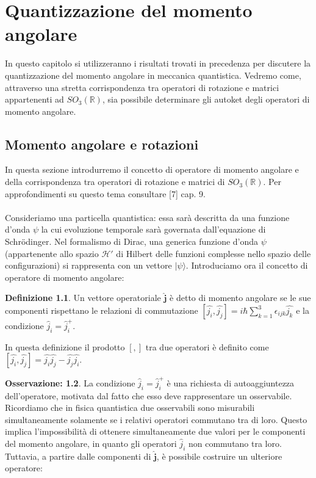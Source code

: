 \documentclass[12pt,a4paper]{report}
\theoremstyle{definition}
\newtheorem{Def}{Definizione}[chapter]
\theoremstyle{Theorem}
\theoremstyle{definition}
\theoremstyle{definition}
\theoremstyle{definition}
\newtheorem{Obs}[Def]{Osservazione:}
\begin{document}
\chapter{Quantizzazione del momento angolare}
In questo capitolo si utilizzeranno i risultati trovati in precedenza per discutere la quantizzazione del momento angolare in meccanica quantistica. Vedremo come, attraverso una stretta corrispondenza tra operatori di rotazione e matrici appartenenti ad $SO_3(\mathbb{R})$, sia possibile determinare gli autoket degli operatori di momento angolare.
\section{Momento angolare e rotazioni}
In questa sezione introdurremo il concetto di operatore di momento angolare e della corrispondenza tra operatori di rotazione e matrici di $SO_3(\mathbb{R})$. Per approfondimenti su questo tema consultare [7] cap. 9. \\\\
Consideriamo una particella quantistica: essa sarà descritta da una funzione d'onda $\psi$ la cui evoluzione temporale sarà governata dall'equazione di Schrödinger. Nel formalismo di Dirac, una generica funzione d'onda $\psi$ (appartenente allo spazio $\mathcal{H'}$ di Hilbert delle funzioni complesse nello spazio delle configurazioni) si rappresenta con un vettore $|\psi\rangle$. Introduciamo ora il concetto di operatore di momento angolare:
\begin{Def}
	Un vettore operatoriale $\hat{\textbf{j}}$ è detto di momento angolare se le sue componenti rispettano le relazioni di commutazione $[\hat{j_i},\hat{j_j}]=i\hbar\sum_{k=1}^{3}\epsilon_{ijk}\hat{j_k}$ e la condizione $\hat{j}_i=\hat{j}^+_i$.
\end{Def} 
In questa definizione il prodotto $[,]$ tra due operatori è definito come $[\hat{j_i},\hat{j_j}]=\hat{j_i}\hat{j_j}-\hat{j_j}\hat{j_i}$.
\begin{Obs}
La condizione $\hat{j}_i=\hat{j}^+_i$ è una richiesta di autoaggiuntezza dell'operatore, motivata dal fatto che esso deve rappresentare un osservabile. Ricordiamo che in fisica quantistica due osservabili sono misurabili simultaneamente solamente se i relativi operatori commutano tra di loro. Questo implica l'impossibilità di ottenere simultaneamente due valori per le componenti del momento angolare, in quanto gli operatori $\hat{j}_i$ non commutano tra loro. Tuttavia, a partire dalle componenti di $\hat{\textbf{j}}$, è possibile costruire un ulteriore operatore:
\end{Obs}
\end{document}
